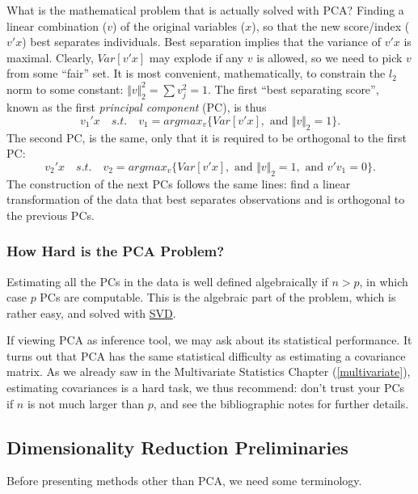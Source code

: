 \documentclass[]{book}
\theoremstyle{definition}
\theoremstyle{definition}
\theoremstyle{definition}
\theoremstyle{remark}
\begin{document}
What is the mathematical problem that is actually solved with PCA?
Finding a linear combination (\(v\)) of the original variables (\(x\)),
so that the new score/index (\(v'x\)) best separates individuals. Best
separation implies that the variance of \(v'x\) is maximal. Clearly,
\(Var[v'x]\) may explode if any \(v\) is allowed, so we need to pick
\(v\) from some ``fair'' set. It is most convenient, mathematically, to
constrain the \(l_2\) norm to some constant:
\(\Vert v \Vert^2_2=\sum v_j^2=1\). The first ``best separating score'',
known as the first \emph{principal component} (PC), is thus
\[v_1'x \quad s.t. \quad v_1=argmax_{v}\{Var[v'x], \text{ and } \Vert v \Vert_2=1  \} .\]
The second PC, is the same, only that it is required to be orthogonal to
the first PC:
\[v_2'x \quad s.t. \quad v_2=argmax_{v}\{Var[v'x], \text{ and } \Vert v \Vert_2=1, \text{ and } v'v_1=0 \} .\]
The construction of the next PCs follows the same lines: find a linear
transformation of the data that best separates observations and is
orthogonal to the previous PCs.

\subsubsection{How Hard is the PCA
Problem?}\label{how-hard-is-the-pca-problem}

Estimating all the PCs in the data is well defined algebraically if
\(n>p\), in which case \(p\) PCs are computable. This is the algebraic
part of the problem, which is rather easy, and solved with
\href{https://en.wikipedia.org/wiki/Singular-value_decomposition}{SVD}.

If viewing PCA as inference tool, we may ask about its statistical
performance. It turns out that PCA has the same statistical difficulty
as estimating a covariance matrix. As we already saw in the Multivariate
Statistics Chapter (\ref{multivariate}), estimating covariances is a
hard task, we thus recommend: don't trust your PCs if \(n\) is not much
larger than \(p\), and see the bibliographic notes for further details.

\subsection{Dimensionality Reduction
Preliminaries}\label{dimensionality-reduction-preliminaries}

Before presenting methods other than PCA, we need some terminology.
\end{document}
